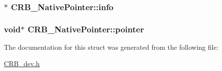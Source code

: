 \subsubsection[{info}]{$\ast$ C\+R\+B\+\_\+\+Native\+Pointer\+::info}\label{struct_c_r_b___native_pointer_af2aec2f2878e463a14f8c203f48a372e}
\hypertarget{struct_c_r_b___native_pointer_ad4bda48ee3efc0fc0c7b1a3bd6409903}{}
\subsubsection[{pointer}]{\setlength{\rightskip}{0pt plus 5cm}void$\ast$ C\+R\+B\+\_\+\+Native\+Pointer\+::pointer}\label{struct_c_r_b___native_pointer_ad4bda48ee3efc0fc0c7b1a3bd6409903}


The documentation for this struct was generated from the following file\+:\begin{DoxyCompactItemize}
\item 
\hyperlink{_c_r_b__dev_8h}{C\+R\+B\+\_\+dev.\+h}\end{DoxyCompactItemize}
